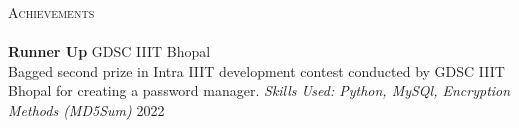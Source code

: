 \documentclass[a4paper]{article}
\newcommand{\lineunder} {
    \vspace*{-8pt} \\
    \hspace*{-18pt} \hrulefill \\
}
\newcommand{\header} [1] {
    {\hspace*{-18pt}\vspace*{6pt} \textsc{#1}}
    \vspace*{-6pt} \lineunder
}
\begin{document}


\vspace{2mm}
\header{Achievements}
\textbf{Runner Up} \hfill GDSC IIIT Bhopal\\
Bagged second prize in Intra IIIT development contest conducted by GDSC IIIT Bhopal for creating a password manager.  
{\textit {Skills Used: Python, MySQl, Encryption Methods (MD5Sum)}}  \hfill 2022\\
\end{document}

